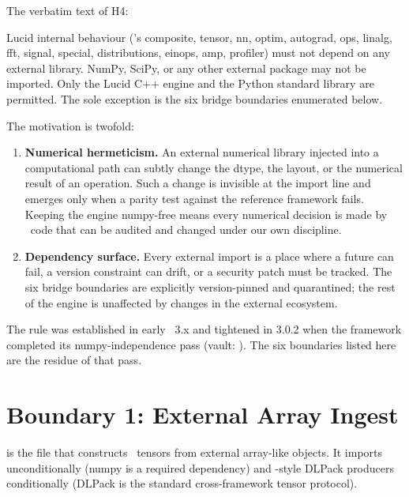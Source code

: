 The verbatim text of H4:

\begin{lucidrule}
Lucid internal behaviour ('s composite, tensor, nn,
optim, autograd, ops, linalg, fft, signal, special, distributions,
einops, amp, profiler) must not depend on any external library.
NumPy, SciPy, or any other external package may not be imported.
Only the Lucid C++ engine and the Python standard library are
permitted. The sole exception is the six bridge boundaries
enumerated below.
\end{lucidrule}

The motivation is twofold:

\begin{enumerate}
  \item \textbf{Numerical hermeticism.} An external numerical
    library injected into a computational path can subtly change
    the dtype, the layout, or the numerical result of an operation.
    Such a change is invisible at the import line and emerges only
    when a parity test against the reference framework fails.
    Keeping the engine numpy-free means every numerical decision is
    made by \Lucid\ code that can be audited and changed under our
    own discipline.
  \item \textbf{Dependency surface.} Every external import is a
    place where a future  can fail, a version
    constraint can drift, or a security patch must be tracked.
    The six bridge boundaries are explicitly version-pinned and
    quarantined; the rest of the engine is unaffected by changes
    in the external ecosystem.
\end{enumerate}

The rule was established in early \Lucid\ 3.x and tightened in 3.0.2
when the framework completed its numpy-independence pass (vault:
). The six boundaries
listed here are the residue of that pass.

\section{Boundary 1: External Array Ingest}
\label{sec:bridge_boundaries:b1}

 is the file that constructs
\Lucid\ tensors from external array-like objects. It imports
 unconditionally (numpy is a required dependency) and
-style DLPack producers conditionally (DLPack is the
standard cross-framework tensor protocol).

